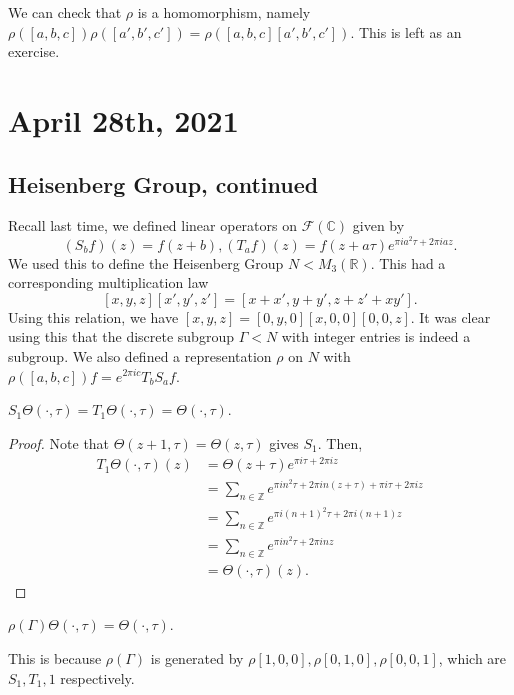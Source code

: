 \documentclass[12pt]{scrartcl}
\newcommand{\Z}{\mathbb{Z}}
\newcommand{\R}{\mathbb{R}}
\newcommand{\C}{\mathbb C}
\let \mc \mathcal
\begin{document}
We can check that $\rho$ is a homomorphism, namely $\rho([a, b, c] )\rho([a', b', c']) = \rho([a, b, c][a', b', c'])$.  This is left as an exercise.  

\pagebreak
\section{April 28th, 2021}
\subsection{Heisenberg Group, continued}
Recall last time, we defined linear operators on $\mc F(\C)$ given by 
$$(S_b f)(z) = f(z + b), (T_a f)(z) = f(z + a \tau) e^{\pi i a^2 \tau + 2 \pi i a z}.$$
We used this to define the Heisenberg Group $N < M_3(\R)$.  This had a corresponding multiplication law
$$[x, y, z] [x', y', z'] = [x + x', y+y', z + z' + xy'].$$
Using this relation, we have $[x, y, z] = [0, y, 0][x, 0 ,0][0, 0, z]$.  It was clear using this that the discrete subgroup $\Gamma < N$ with integer entries is indeed a subgroup.    We also defined a representation $\rho$ on $N$ with $\rho([a, b, c])f = e^{2 \pi i c} T_b S_a f$.

\begin{lemma} $S_1 \Theta(\cdot, \tau) = T_1 \Theta(\cdot, \tau) = \Theta(\cdot, \tau)$.
\end{lemma}
\begin{proof}
Note that $\Theta(z+1, \tau) = \Theta(z, \tau)$ gives $S_1$.  Then,
\begin{align*}
T_1 \Theta(\cdot, \tau)(z) &= \Theta(z + \tau) e^{\pi i \tau + 2 \pi i z} \\
&= \sum_{n \in \Z} e^{\pi i n^2 \tau + 2\pi i n(z + \tau) + \pi i \tau + 2 \pi i z} \\
&= \sum_{n \in \Z} e^{\pi i (n+1)^2 \tau + 2 \pi i (n + 1) z} \\
&= \sum_{n \in \Z} e^{\pi i n^2 \tau + 2 \pi i n z} \\
&= \Theta(\cdot, \tau)(z).
\end{align*}
\end{proof}
\begin{corollary} $\rho(\Gamma) \Theta(\cdot, \tau) = \Theta(\cdot, \tau)$.
\end{corollary}
This is because $\rho(\Gamma)$ is generated by $\rho[1, 0, 0], \rho [0, 1, 0], \rho [0, 0, 1]$, which are $S_1, T_1, 1$ respectively.  
\end{document}
